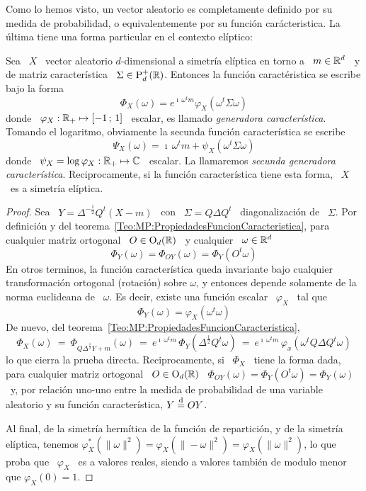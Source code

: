 Como lo hemos visto, un vector aleatorio es completamente definido por su medida
de  probabilidad,  o  equivalentemente  por su  funci\'on  car\'acteristica.  La
\'ultima tiene una forma particular en el contexto el\'iptico:
%
\begin{teorema}\label{Teo:MP:GeneradorasCaracteristicas}
%
  Sea \ $X$ \ vector aleatorio $d$-dimensional a simetr\'ia el\'iptica en torno a
  \   $m  \in  \mathbb{R}^d$   \  y   de  matriz   caracter\'istica  \   $\Sigma  \in
  \mathrm{P}_d^+(\mathbb{R})$. Entonces la funci\'on caract\'eristica se escribe bajo la forma
  \[
  \Phi_X(\omega)  = e^{\imath  \,  \omega^t m}  \varphi_X\left( \omega^t  \Sigma
    \omega \right)
  \]
  donde  \  $\varphi_X:  \mathbb{R}_+  \mapsto  [-1 \, ; \, 1]$ \  escalar,  es  llamado  {\em
    generadora  caracter\'istica}. Tomando el  logaritmo, obviamente  la secunda
  funci\'on caracter\'istica se escribe
  \[
  \Psi_X(\omega) =  \imath \, \omega^t  m + \psi_X\left( \omega^t  \Sigma \omega
  \right)
  \]
  donde  \ $\psi_X  =  \log \varphi_X:  \mathbb{R}_+  \mapsto \mathbb{C}$  \ escalar.   La
  llamaremos  {\em secunda generadora  caracter\'istica}. Reciprocamente,  si la
  funci\'on caracter\'istica tiene esta forma, \ $X$ \ es a simetr\'ia el\'iptica.
\end{teorema}
%
\begin{proof}
  Sea \  $Y = \Delta^{-\frac12} Q^t  \left( X - m  \right)$ \ con \  $\Sigma = Q
  \Delta  Q^t$  \ diagonalizaci\'on  de  \  $\Sigma$.   Por definici\'on  y  del
  teorema~\ref{Teo:MP:PropiedadesFuncionCaracteristica},  para  cualquier matriz
  ortogonal \ $O \in \mathrm{O}_d(\mathbb{R})$ \ y cualquier \ $\omega \in \mathbb{R}^d$
  \[
  \Phi_Y(\omega) = \Phi_{O Y}(\omega) = \Phi_Y(O^t \omega)
  \]
  En  otros  terminos,  la  funci\'on  caracter\'istica  queda  invariante  bajo
  cualquier transformaci\'on  ortogonal (rotaci\'on) sobre  $\omega$, y entonces
  depende solamente de  la norma euclideana de \ $\omega$.  Es decir, existe una
  funci\'on escalar \ $\varphi_X$ \ tal que
  \[
  \Phi_Y(\omega) = \varphi_X(\omega^t \omega)
  \]
  De nuevo, del teorema~\ref{Teo:MP:PropiedadesFuncionCaracteristica},
  \[
  \Phi_X(\omega)  \:  = \:  \Phi_{Q  \Delta^{\frac12} Y  +  m}(\omega)  \: =  \:
  e^{\imath  \, \omega^t  m} \,  \Phi_Y( \Delta^{\frac12}  Q^t \omega)  \:  = \:
  e^{\imath \, \omega^t m} \, \varphi_x( \omega^t Q \Delta Q^t \omega)
  \]
  lo que  cierra la prueba  directa.  Reciprocamente, si  \ $\Phi_X$ \  tiene la
  forma dada, para  cualquier matriz ortogonal \ $O  \in \mathrm{O}_d(\mathbb{R})$ \ $\Phi_{O
    Y}(\omega)  = \Phi_Y( O^t  \omega )  = \Phi_Y(\omega)$  \ y,  por relaci\'on
  uno-uno  entre  la medida  de  probabilidad de  una  variable  aleatorio y  su
  funci\'on caracter\'istica, $Y \stackrel{\mathrm{d}}{=} O Y$.

  Al final, de la simetr\'ia herm\'itica  de la funci\'on de repartici\'on, y de
  la simetr\'ia  el\'iptica, tenemos $\varphi_X^*\left(  \| \omega \|^2  \right) =
  \varphi_X\left(  \| -\omega  \|^2  \right) =  \varphi_X\left(  \| \omega  \|^2
  \right)$,  lo que proba  que \  $\varphi_X$ \  es a  valores reales,  siendo a
  valores tambi\'en de modulo menor que $\varphi_X(0) = 1$.
\end{proof}
